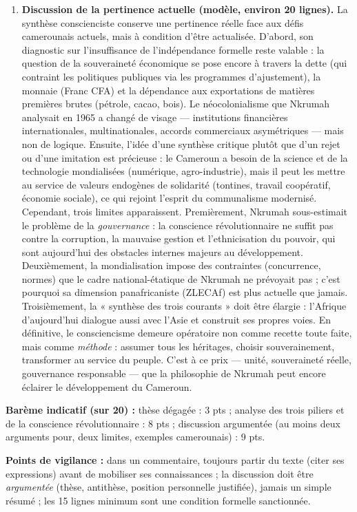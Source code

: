\documentclass[11pt]{article}
\begin{document}
\begin{corrige}
\begin{enumerate}
\item \textbf{Discussion de la pertinence actuelle (modèle, environ 20 lignes).} La synthèse conscienciste conserve une pertinence réelle face aux défis camerounais actuels, mais à condition d'être actualisée. D'abord, son diagnostic sur l'insuffisance de l'indépendance formelle reste valable : la question de la souveraineté économique se pose encore à travers la dette (qui contraint les politiques publiques via les programmes d'ajustement), la monnaie (Franc CFA) et la dépendance aux exportations de matières premières brutes (pétrole, cacao, bois). Le néocolonialisme que Nkrumah analysait en 1965 a changé de visage — institutions financières internationales, multinationales, accords commerciaux asymétriques — mais non de logique. Ensuite, l'idée d'une synthèse critique plutôt que d'un rejet ou d'une imitation est précieuse : le Cameroun a besoin de la science et de la technologie mondialisées (numérique, agro-industrie), mais il peut les mettre au service de valeurs endogènes de solidarité (tontines, travail coopératif, économie sociale), ce qui rejoint l'esprit du communalisme modernisé. Cependant, trois limites apparaissent. Premièrement, Nkrumah sous-estimait le problème de la \emph{gouvernance} : la conscience révolutionnaire ne suffit pas contre la corruption, la mauvaise gestion et l'ethnicisation du pouvoir, qui sont aujourd'hui des obstacles internes majeurs au développement. Deuxièmement, la mondialisation impose des contraintes (concurrence, normes) que le cadre national-étatique de Nkrumah ne prévoyait pas ; c'est pourquoi sa dimension panafricaniste (ZLECAf) est plus actuelle que jamais. Troisièmement, la « synthèse des trois courants » doit être élargie : l'Afrique d'aujourd'hui dialogue aussi avec l'Asie et construit ses propres voies. En définitive, le consciencisme demeure opératoire non comme recette toute faite, mais comme \emph{méthode} : assumer tous les héritages, choisir souverainement, transformer au service du peuple. C'est à ce prix — unité, souveraineté réelle, gouvernance responsable — que la philosophie de Nkrumah peut encore éclairer le développement du Cameroun.
\end{enumerate}

\textbf{Barème indicatif (sur 20) :} thèse dégagée : 3 pts ; analyse des trois piliers et de la conscience révolutionnaire : 8 pts ; discussion argumentée (au moins deux arguments pour, deux limites, exemples camerounais) : 9 pts.

\textbf{Points de vigilance :} dans un commentaire, toujours partir du texte (citer ses expressions) avant de mobiliser ses connaissances ; la discussion doit être \emph{argumentée} (thèse, antithèse, position personnelle justifiée), jamais un simple résumé ; les 15 lignes minimum sont une condition formelle sanctionnée.
\end{corrige}
\end{document}
